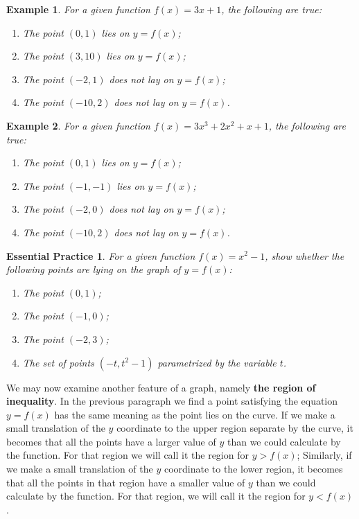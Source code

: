 \documentclass[12pt]{article}
\newtheorem*{example}{Example}
\newtheorem{exercise}{Essential Practice}[subsubsection]
\begin{document}
    \begin{example}
        For a given function $f(x)=3x+1$, the following are true:\begin{enumerate}
            \item The point $(0,1)$ lies on $y=f(x)$;
            \item The point $(3,10)$ lies on $y=f(x)$;
            \item The point $(-2,1)$ does not lay on $y=f(x)$;
            \item The point $(-10,2)$ does not lay on $y=f(x)$.
        \end{enumerate} 
    \end{example}

    \begin{example}
        For a given function $f(x)=3x^3+2x^2+x+1$, the following are true:\begin{enumerate}
            \item The point $(0,1)$ lies on $y=f(x)$;
            \item The point $(-1,-1)$ lies on $y=f(x)$;
            \item The point $(-2,0)$ does not lay on $y=f(x)$;
            \item The point $(-10,2)$ does not lay on $y=f(x)$.
        \end{enumerate} 
    \end{example}

    \begin{exercise}
        For a given function $f(x)=x^2-1$, show whether the following points are lying on the graph of $y=f(x)$:\begin{enumerate}
            \item The point $(0,1)$;
            \item The point $(-1,0)$;
            \item The point $(-2,3)$;
            \item The set of points $(-t,t^2-1)$ parametrized by the variable $t$.
        \end{enumerate} 
    \end{exercise}

    We may now examine another feature of a graph, namely \textbf{the region of inequality}. In the previous paragraph we find a point satisfying the equation $y=f(x)$ has the same meaning as the point lies on the curve. If we make a small translation of the $y$ coordinate to the upper region separate by the curve, it becomes that all the points have a larger value of $y$ than we could calculate by the function. For that region we will call it the region for $y>f(x)$; Similarly, if we make a small translation of the $y$ coordinate to the lower region, it becomes that all the points in that region have a smaller value of $y$ than we could calculate by the function. For that region, we will call it the region for $y<f(x)$.
\end{document}
